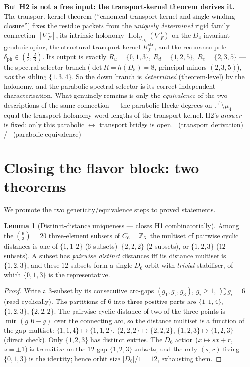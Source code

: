 \documentclass[11pt,a4paper]{article}
\newcommand{\dph}{\delta_{\mathrm{ph}}}
\theoremstyle{definition}
\newtheorem{lemma}{Lemma}
\begin{document}
\smallskip
\noindent\textbf{But H2 is not a free input: the transport-kernel theorem derives it.} The transport-kernel theorem
(``canonical transport kernel and single-winding closure'') fixes the residue packets from the
\emph{uniquely determined} rigid family connection $[\nabla_F^\star]$, its intrinsic holonomy
$\operatorname{Hol}_{\mathcal G_{D_4}}(\nabla_F^\star)$ on the $D_4$-invariant geodesic spine, the
structural transport kernel $K_f^{\mathrm{str}}$, and the resonance pole $\dph\in(\tfrac13,\tfrac23)$.
Its output is exactly $R_u=\{0,1,3\}$, $R_d=\{1,2,5\}$, $R_e=\{2,3,5\}$ --- the spectral-selector branch
($\det R=h(D_5)=8$, principal minors $(2,3,5)$), \emph{not} the sibling $\{1,3,4\}$. So the down branch
is \emph{determined} (theorem-level) by the holonomy, and the parabolic spectral selector is its correct
independent characterisation. What genuinely remains is only the \emph{equivalence} of the two
descriptions of the same connection --- the parabolic Hecke degrees on $\mathbb P^1\setminus\mu_4$ equal
the transport-holonomy word-lengths of the transport kernel. H2's \emph{answer} is fixed; only this parabolic
$\leftrightarrow$ transport bridge is open. \mE\ (transport derivation) / \mC\ (parabolic equivalence)
\par\smallskip

\section{Closing the flavor block: two theorems}
We promote the two genericity/equivalence steps to proved statements.

\begin{lemma}[Distinct-distance uniqueness --- closes H1 combinatorially]
\label{lem:dd}
Among the $\binom63=20$ three-element subsets of $C_6=\mathbb Z_6$, the multiset of pairwise cyclic
distances is one of $\{1,1,2\}$ ($6$ subsets), $\{2,2,2\}$ ($2$ subsets), or $\{1,2,3\}$ ($12$ subsets).
A subset has \emph{pairwise distinct} distances iff its distance multiset is $\{1,2,3\}$, and these $12$
subsets form a single $D_6$-orbit with \emph{trivial} stabiliser, of which $\{0,1,3\}$ is the
representative.
\end{lemma}
\begin{proof}
Write a $3$-subset by its consecutive arc-gaps $(g_1,g_2,g_3)$, $g_i\ge1$, $\sum g_i=6$ (read cyclically).
The partitions of $6$ into three positive parts are $\{1,1,4\}$, $\{1,2,3\}$, $\{2,2,2\}$. The pairwise
cyclic distance of two of the three points is $\min(g,6-g)$ over the connecting arc, so the distance
multiset is a function of the gap multiset: $\{1,1,4\}\!\mapsto\!\{1,1,2\}$, $\{2,2,2\}\!\mapsto\!\{2,2,2\}$,
$\{1,2,3\}\!\mapsto\!\{1,2,3\}$ (direct check). Only $\{1,2,3\}$ has distinct entries. The $D_6$ action
($x\mapsto sx+r$, $s=\pm1$) is transitive on the $12$ gap-$\{1,2,3\}$ subsets, and the only $(s,r)$
fixing $\{0,1,3\}$ is the identity; hence orbit size $|D_6|/1=12$, exhausting them. \qedhere
\end{proof}
\end{document}
